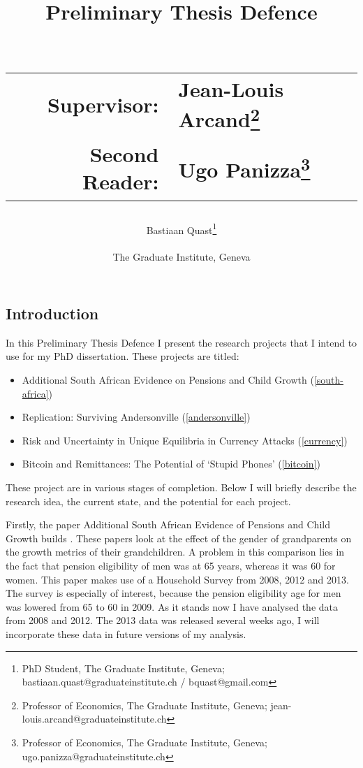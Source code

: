 \documentclass[a4paper]{report}\usepackage{graphicx, color}
\title{Preliminary Thesis Defence\\~\\
\begin{tabular}{rl}
Supervisor:&Jean-Louis Arcand\footnote{Professor of Economics, The Graduate Institute, Geneva; jean-louis.arcand@graduateinstitute.ch}\\
Second Reader:&Ugo Panizza\footnote{Professor of Economics, The Graduate Institute, Geneva; ugo.panizza@graduateinstitute.ch}
\end{tabular}
}
\author{Bastiaan Quast\thanks{PhD Student, The Graduate Institute, Geneva; bastiaan.quast@graduateinstitute.ch / bquast@gmail.com}\\~\\
The Graduate Institute, Geneva}
\begin{document}
\maketitle
\tableofcontents
\listoftables
\listoffigures

\begin{refsection}
\chapter{Introduction}
In this Preliminary Thesis Defence I present the research projects that I intend to use for my PhD dissertation. These projects are titled:

\begin{itemize}
\item Additional South African Evidence on Pensions and Child Growth (\ref{south-africa})
\item Replication: Surviving Andersonville (\ref{andersonville})
\item Risk and Uncertainty in Unique Equilibria in Currency Attacks (\ref{currency})
\item Bitcoin and Remittances: The Potential of `Stupid Phones' (\ref{bitcoin})
\end{itemize}

These project are in various stages of completion. Below I will briefly describe the research idea, the current state, and the potential for each project.

Firstly, the paper Additional South African Evidence of Pensions and Child Growth builds \textcite{duflo2000, duflo2003}. These papers look at the effect of the gender of grandparents on the growth metrics of their grandchildren. A problem in this comparison lies in the fact that pension eligibility of men was at 65 years, whereas it was 60 for women. This paper makes use of a Household Survey from 2008, 2012 and 2013. The survey is especially of interest, because the pension eligibility age for men was lowered from 65 to 60 in 2009. As it stands now I have analysed the data from 2008 and 2012. The 2013 data was released several weeks ago, I will incorporate these data in future versions of my analysis.


\end{refsection}
\end{document}
